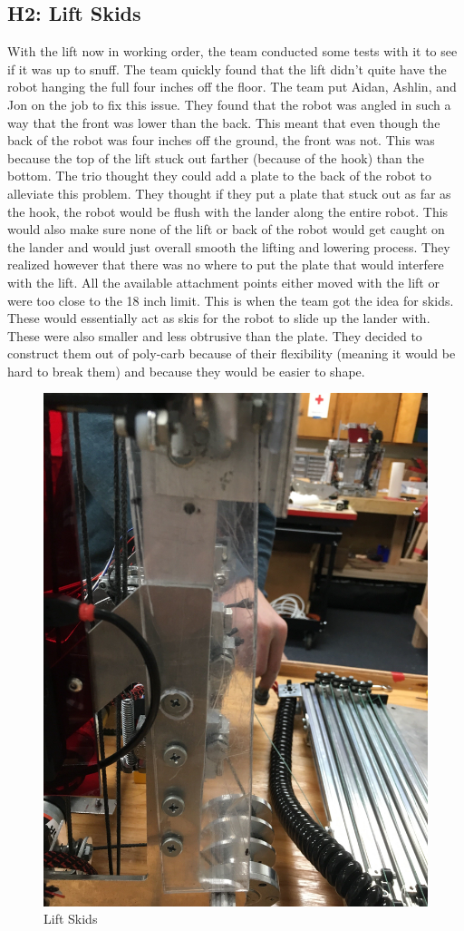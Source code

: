 \documentclass{article}
\begin{document}
\subsection{H2: Lift Skids}

With the lift now in working order, the team conducted some tests with it to see if it was up to snuff. The team quickly found that the lift didn't quite have the robot hanging the full four inches off the floor. The team put Aidan, Ashlin, and Jon on the job to fix this issue. They found that the robot was angled in such a way that the front was lower than the back. This meant that even though the back of the robot was four inches off the ground, the front was not. This was because the top of the lift stuck out farther (because of the hook) than the bottom. The trio thought they could add a plate to the back of the robot to alleviate this problem. They thought if they put a plate that stuck out as far as the hook, the robot would be flush with the lander along the entire robot. This would also make sure none of the lift or back of the robot would get caught on the lander and would just overall smooth the lifting and lowering process. They realized however that there was no where to put the plate that would interfere with the lift. All the available attachment points either moved with the lift or were too close to the 18 inch limit. This is when the team got the idea for skids. These would essentially act as skis for the robot to slide up the lander with. These were also smaller and less obtrusive than the plate. They decided to construct them out of poly-carb because of their flexibility (meaning it would be hard to break them) and because they would be easier to shape.

\begin{figure}
    \centering
    \includegraphics[width=.6 \textwidth]{21_01-21/images/liftskids.JPG}
    \caption{Lift Skids}
    \label{fig:skids}
\end{figure}
\end{document}
